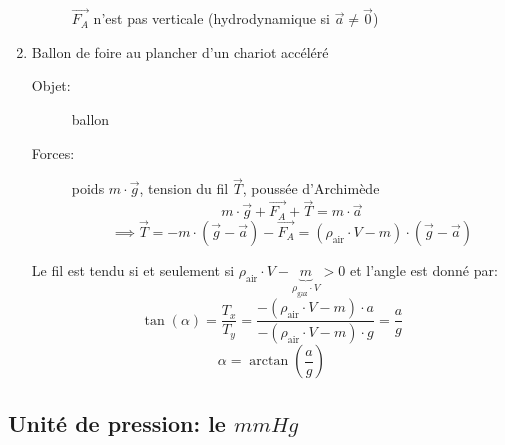 \documentclass[
    11pt,
    a4paper,
    oneside,
    headinlcude, footinclude,
    twoside,
]{report}
\renewcommand{\vec}[1]{\overrightarrow{#1}}
\newcommand\Warning{
    \makebox[1.4em][c]{
    \makebox[-5.5pt][c]{\raisebox{.2em}{!}}
    \makebox[0pt][c]{\color{red}\huge$\bigtriangleup$}}
}
\begin{document}
\begin{enumerate}
\begin{center}
\begin{minipage}{.49\linewidth}
\begin{description}
                    \Warning $\vec{F_{A}}$ n'est pas verticale (hydrodynamique
                    si $\vec a \neq \vec 0$)

                \end{description}
            \end{minipage}
        \end{center}

    \item Ballon de foire au plancher d'un chariot acc\'el\'er\'e

        \begin{center}
            \begin{minipage}{.5\linewidth}
            \end{minipage}
            \begin{minipage}{.49\linewidth}
                \setlength{\parskip}{.3em}

                \begin{description}
                    \item[Objet:] ballon
                    \item[Forces:] poids $m \cdot \vec g$, tension du fil $\vec T$,
                        pouss\'ee d'Archim\`ede
                        \begin{equation}
                            m\cdot \vec g + \vec{F_{A}}+ \vec T= m \cdot \vec a
                        \end{equation}
                        $$\implies \vec T = - m \cdot (\vec g - \vec a) - \vec{F_{A}}
                        = (\rho_{\text{air}}\cdot V - m) \cdot (\vec g - \vec a)$$
                \end{description}
            \end{minipage}
        \end{center}
        Le fil est tendu si et seulement si $\rho_{\text{air}} \cdot V - \underbrace{m}_{\rho_{\text{gaz}} \cdot V} > 0$
        et l'angle est donn\'e par:
        $$\tan(\alpha) = \frac{T_{x}}{T_{y}} = \frac{- (\rho_{\text{air}} \cdot V - m) \cdot a}{-
        (\rho_{\text{air}} \cdot V - m) \cdot g} = \frac{a}{g}$$
        $$\alpha = \arctan(\frac{a}{g})$$
\end{enumerate}

\subsection{Unit\'e de pression: le $mmHg$ }
\label{sub:unit'e_de_pression_le_mmhg_}
\end{document}
